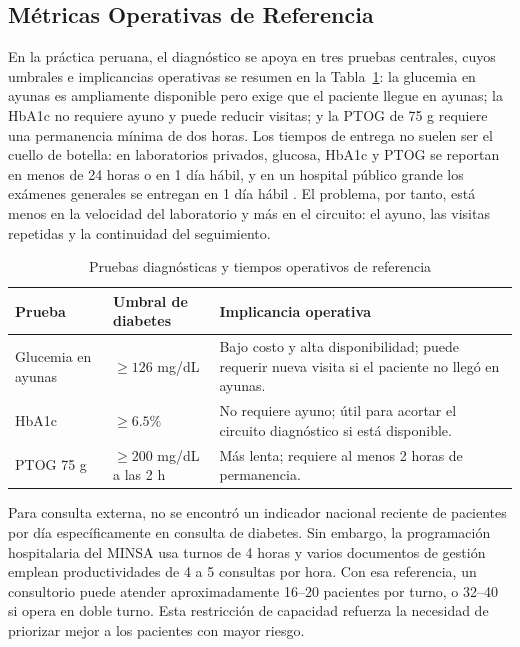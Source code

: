 \documentclass[conference]{IEEEtran}
\begin{document}
\subsection{Métricas Operativas de Referencia}

En la práctica peruana, el diagnóstico se apoya en tres pruebas centrales, cuyos umbrales e implicancias operativas se resumen en la Tabla~\ref{tab:pruebas_operativas}: la glucemia en ayunas es ampliamente disponible pero exige que el paciente llegue en ayunas; la HbA1c no requiere ayuno y puede reducir visitas; y la PTOG de 75 g requiere una permanencia mínima de dos horas. Los tiempos de entrega no suelen ser el cuello de botella: en laboratorios privados, glucosa, HbA1c y PTOG se reportan en menos de 24 horas o en 1 día hábil, y en un hospital público grande los exámenes generales se entregan en 1 día hábil \cite{multilab_glucosa,multilab_hba1c,loayza2025}. El problema, por tanto, está menos en la velocidad del laboratorio y más en el circuito: el ayuno, las visitas repetidas y la continuidad del seguimiento.

\begin{table}[H]
\centering
\caption{Pruebas diagnósticas y tiempos operativos de referencia}
\label{tab:pruebas_operativas}
\scriptsize
\begin{tabularx}{\columnwidth}{@{}lXX@{}}
\toprule
\textbf{Prueba} & \textbf{Umbral de diabetes} & \textbf{Implicancia operativa} \\
\midrule
Glucemia en ayunas & $\geq 126$ mg/dL & Bajo costo y alta disponibilidad; puede requerir nueva visita si el paciente no llegó en ayunas. \\
HbA1c & $\geq 6.5\%$ & No requiere ayuno; útil para acortar el circuito diagnóstico si está disponible. \\
PTOG 75 g & $\geq 200$ mg/dL a las 2 h & Más lenta; requiere al menos 2 horas de permanencia. \\
\bottomrule
\end{tabularx}
\end{table}

Para consulta externa, no se encontró un indicador nacional reciente de pacientes por día específicamente en consulta de diabetes. Sin embargo, la programación hospitalaria del MINSA usa turnos de 4 horas y varios documentos de gestión emplean productividades de 4 a 5 consultas por hora. Con esa referencia, un consultorio puede atender aproximadamente 16--20 pacientes por turno, o 32--40 si opera en doble turno. Esta restricción de capacidad refuerza la necesidad de priorizar mejor a los pacientes con mayor riesgo.
\end{document}
